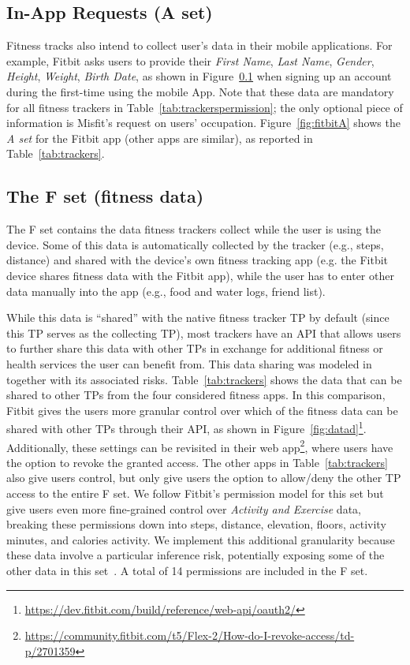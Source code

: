 \subsection{In-App Requests (A set)}
Fitness tracks also intend to collect user's data in their mobile applications. For example, Fitbit asks users to provide their \textit{First Name}, \textit{Last Name}, \textit{Gender}, \textit{Height},  \textit{Weight}, \textit{Birth Date}, as shown in Figure~\ref{} when signing up an account during the first-time using the mobile App. Note that these data are mandatory for all fitness trackers in Table~\ref{tab:trackerspermission}; the only optional piece of information is Misfit's request on users' occupation. Figure~\ref{fig:fitbitA} shows the \emph{A set} for the Fitbit app (other apps are similar), as reported in Table~\ref{tab:trackers}.

\subsection{The F set (fitness data)}
\label{sec:fset}

The F set contains the data fitness trackers collect while the user is using the device. Some of this data is automatically collected by the tracker (e.g., steps, distance) and shared with the device's own fitness tracking app (e.g. the Fitbit device shares fitness data with the Fitbit app), while the user has to enter other data manually into the app (e.g., food and water logs, friend list).

While this data is ``shared'' with the native fitness tracker TP by default (since this TP serves as the collecting TP), most trackers have an API that allows users to further share this data with other TPs in exchange for additional fitness or health services the user can benefit from. This data sharing was modeled in~\cite{torre2017supporting} together with its associated risks. Table~\ref{tab:trackers} shows the data that can be shared to other TPs from the four considered fitness apps. In this comparison, Fitbit gives the users more granular control over which of the fitness data can be shared with other TPs through their API, as shown in Figure~\ref{fig:datad}\footnote{\url{https://dev.fitbit.com/build/reference/web-api/oauth2/}}. Additionally, these settings can be revisited in their web app\footnote{\url{https://community.fitbit.com/t5/Flex-2/How-do-I-revoke-access/td-p/2701359}}, where users have the option to revoke the granted access. The other apps in Table~\ref{tab:trackers} also give users control, but only give users the option to allow/deny the other TP access to the entire F set. We follow Fitbit's permission model for this set but give users even more fine-grained control over \textit{Activity and Exercise} data, breaking these permissions down into steps, distance, elevation, floors, activity minutes, and calories activity. We implement this additional granularity because these data involve a particular inference risk, potentially exposing some of the other data in this set~\cite{torre2017supporting}. A total of 14 permissions are included in the F set. 

